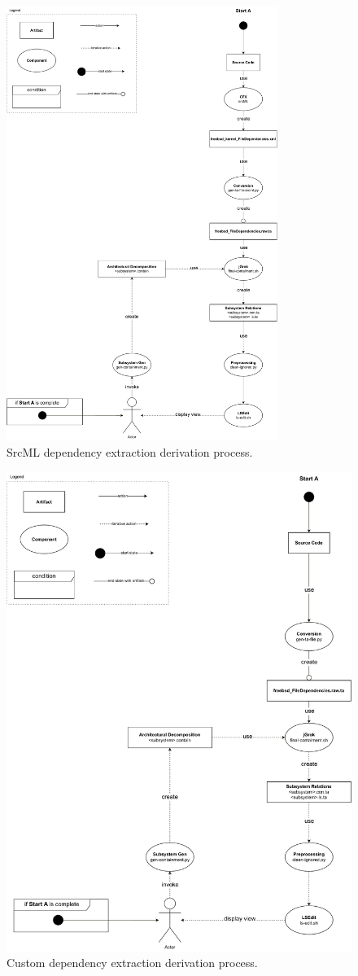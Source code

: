 \documentclass[12pt, dvipsnames, a4paper]{article}
\begin{document}
\begin{figure}[!htb]
	\center
	\includegraphics[width = 250pt]{assets/derivation/srcml.pdf}
	\caption{SrcML dependency extraction derivation process. \cite{sourcecode}}
\end{figure}
\begin{figure}[!htb]
	\center
	\includegraphics[width = 350pt]{assets/derivation/custom.pdf}
	\caption{Custom dependency extraction derivation process.\cite{sourcecode}}
\end{figure}
\end{document}
